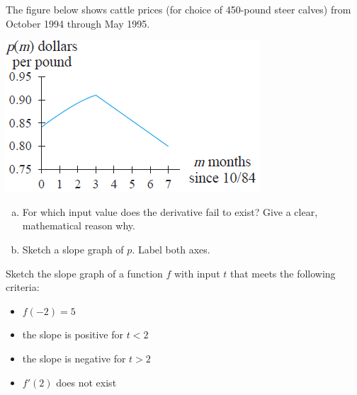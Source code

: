 \documentclass[notes]{subfiles}
\begin{document}
		\begin{ex}
			The figure below shows cattle prices (for choice of 450-pound steer calves) from October 1994 through May 1995.\\[10pt]
			\begin{center}
				\includegraphics[scale = 1.5]{./img/sec26-2.png}
			\end{center}
			\begin{enumerate}[(a)]
				\item For which input value does the derivative fail to exist?  Give a clear, mathematical reason why.
				\item Sketch a slope graph of $p$.  Label both axes.
			\end{enumerate}
		\end{ex}
			\newpage
			
		\begin{ex}
			Sketch the slope graph of a function $f$ with input $t$ that meets the following criteria:
				\begin{itemize}
					\item $f(-2) = 5$
					\item the slope is positive for $t < 2$
					\item the slope is negative for $t > 2$
					\item $f'(2)$ does not exist
				\end{itemize}
		\end{ex}
			
\end{document}
